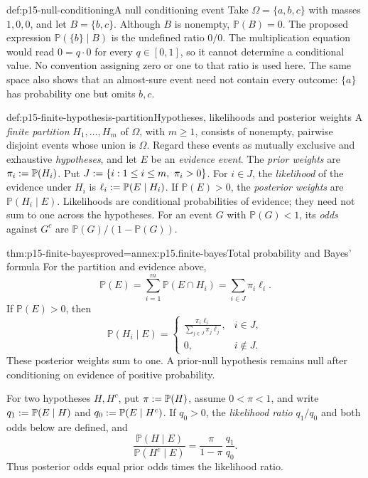 \begin{hbwarning}{def:p15-null-conditioning}{A null conditioning event}
Take \(\Omega=\{a,b,c\}\) with masses \(1,0,0\), and let
\(B=\{b,c\}\). Although \(B\) is nonempty, \(\mathbb P(B)=0\).
The proposed expression \(\mathbb P(\{b\}\mid B)\) is the undefined
ratio \(0/0\). The multiplication equation would read \(0=q\cdot0\)
for every \(q\in[0,1]\), so it cannot determine a conditional value.
No convention assigning zero or one to that ratio is used here. The same
space also shows that an almost-sure event need not contain every outcome:
\(\{a\}\) has probability one but omits \(b,c\).
\end{hbwarning}

\begin{hbdefinition}{def:p15-finite-hypothesis-partition}{Hypotheses, likelihoods and posterior weights}
A \emph{finite partition} \(H_1,\ldots,H_m\) of \(\Omega\), with
\(m\geq1\), consists of nonempty, pairwise disjoint events whose union
is \(\Omega\). Regard these events as mutually exclusive and exhaustive
\emph{hypotheses}, and let \(E\) be an \emph{evidence event}.
The \emph{prior weights} are \(\pi_i\mathrel{:=}\mathbb P(H_i)\). Put
\(J\mathrel{:=}\{i:1\leq i\leq m,\ \pi_i>0\}\). For \(i\in J\),
the \emph{likelihood} of the evidence under \(H_i\) is
\(\ell_i\mathrel{:=}\mathbb P(E\mid H_i)\). If \(\mathbb P(E)>0\),
the \emph{posterior weights} are \(\mathbb P(H_i\mid E)\).
Likelihoods are conditional probabilities of evidence; they need not sum
to one across the hypotheses.
For an event \(G\) with \(\mathbb P(G)<1\), its \emph{odds}
against \(G^c\) are \(\mathbb P(G)/(1-\mathbb P(G))\).
\end{hbdefinition}

\begin{hbtheorem}{thm:p15-finite-bayes}{proved=annex:p15.finite-bayes}{Total probability and Bayes' formula}
For the partition and evidence above,
\[
 \mathbb P(E)=\sum_{i=1}^m\mathbb P(E\cap H_i)
             =\sum_{i\in J}\pi_i\ell_i.
\]
If \(\mathbb P(E)>0\), then
\[
 \mathbb P(H_i\mid E)=
 \begin{cases}
 \displaystyle\frac{\pi_i\ell_i}{\sum_{j\in J}\pi_j\ell_j},&i\in J,\\[1ex]
 0,&i\notin J.
 \end{cases}
\]
These posterior weights sum to one. A prior-null hypothesis remains null
after conditioning on evidence of positive probability.

For two hypotheses \(H,H^c\), put \(\pi\mathrel{:=}\mathbb P(H)\), assume
\(0<\pi<1\), and write \(q_1\mathrel{:=}\mathbb P(E\mid H)\) and
\(q_0\mathrel{:=}\mathbb P(E\mid H^c)\). If \(q_0>0\), the
\emph{likelihood ratio} \(q_1/q_0\) and both odds below are defined, and
\[
 \frac{\mathbb P(H\mid E)}{\mathbb P(H^c\mid E)}
 =\frac{\pi}{1-\pi}\,\frac{q_1}{q_0}.
\]
Thus posterior odds equal prior odds times the likelihood ratio.
\end{hbtheorem}


